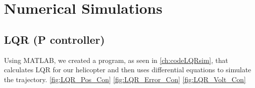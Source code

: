\chapter{Numerical Simulations}
\label{ch: Chapter4}

\section{LQR (P controller)}
Using MATLAB, we created a program, as seen in \ref{ch:codeLQRsim}, that calculates LQR for our helicopter and then uses differential equations to simulate the trajectory. \ref{fig:LQR_Pos_Con} \ref{fig:LQR_Error_Con}  \ref{fig:LQR_Volt_Con}  


